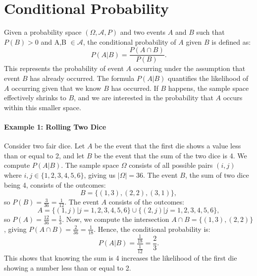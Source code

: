 \section{Conditional Probability}
    Given a probability space $(\Omega, \mathcal{A}, {P})$ and two events $A$ and $B$ such that ${P}(B) > 0$ and A,B $\in \mathcal{A}$, the conditional probability of $A$ given $B$ is defined as:
    \[
    {P}(A | B) = \frac{{P}(A \cap B)}{{P}(B)}.
    \]
    This represents the probability of event $A$ occurring under the assumption that event $B$ has already occurred. \newline
    The formula ${P}(A | B)$ quantifies the likelihood of $A$ occurring given that we know $B$ has occurred. If $B$ happens, the sample space effectively shrinks to $B$, and we are interested in the probability that $A$ occurs within this smaller space.
    
    \paragraph{Example 1: Rolling Two Dice}
    Consider two fair dice. Let $A$ be the event that the first die shows a value less than or equal to 2, and let $B$ be the event that the sum of the two dice is 4. We compute ${P}(A | B)$.\newline
    The sample space $\Omega$ consists of all possible pairs $(i,j)$ where $i,j \in \{1, 2, 3, 4, 5, 6\}$, giving us $|\Omega| = 36$. The event $B$, the sum of two dice being 4, consists of the outcomes: 
    \[
    B = \{(1,3), (2,2), (3,1)\},
    \]
    so ${P}(B) = \frac{3}{36} = \frac{1}{12}$.
    The event $A$ consists of the outcomes:
    \[
    A = \{(1,j) | j = 1,2,3,4,5,6\} \cup \{(2,j) | j = 1,2,3,4,5,6\},
    \]
    so ${P}(A) = \frac{12}{36} = \frac{1}{3}$.\newline
    Now, we compute the intersection $A \cap B = \{(1,3), (2,2)\}$, giving ${P}(A \cap B) = \frac{2}{36} = \frac{1}{18}$. Hence, the conditional probability is:
    \[
    {P}(A | B) = \frac{\frac{1}{18}}{\frac{1}{12}} = \frac{2}{3}.
    \]
    This shows that knowing the sum is 4 increases the likelihood of the first die showing a number less than or equal to 2.
    
